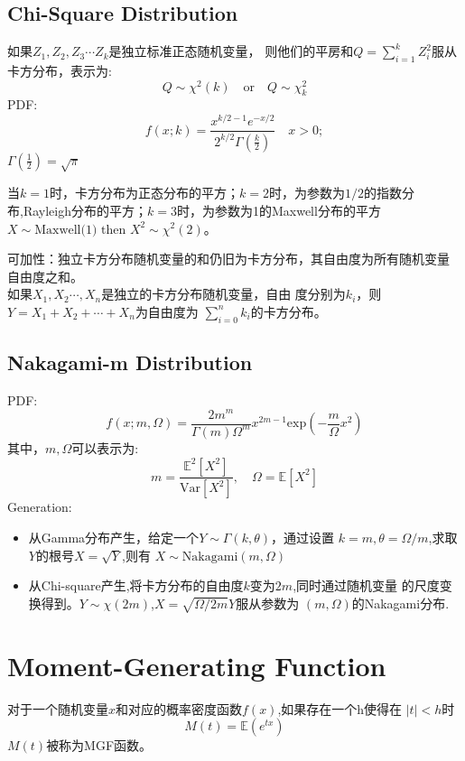 \documentclass[fontset=none,oneside]{book}
\begin{document}
\subsection{Chi-Square Distribution}
\noindent 如果$Z_{1},Z_{2},Z_{3}\cdots Z_{k}$是独立标准正态随机变量，
则他们的平房和$Q=\sum_{i=1}^{k}Z_{i}^{2}$服从卡方分布，表示为:
\begin{equation}
\label{eq:33}
Q\sim \chi^{2}(k)\quad\text{or}\quad Q\sim\chi_{k}^{2}
\end{equation}
PDF:
\begin{equation}
\label{eq:34}
f(x;k)=\frac{x^{k/2-1}e^{-x/2}}{2^{k/2}\Gamma(\frac{k}{2})} \quad x>0;
\end{equation}
$\Gamma(\frac{1}{2})=\sqrt{\pi}$
\begin{shaded}
当$k=1$时，卡方分布为正态分布的平方；$k=2$时，为参数为$1/2$的指数分
布,Rayleigh分布的平方；$k=3$时，为参数为1的Maxwell分布的平方
$X\sim\text{Maxwell(1) then }X^{2}\sim\chi^{2}(2)$。
\end{shaded}
可加性：独立卡方分布随机变量的和仍旧为卡方分布，其自由度为所有随机变量
自由度之和。\\

如果$X_{1},X_{2}\cdots,X_{n}$是独立的卡方分布随机变量，自由
度分别为$k_{i}$，则$Y=X_{1}+X_{2}+\cdots+X_{n}$为自由度为
$\sum_{i=0}^{n}k_{i}$的卡方分布。
\subsection{Nakagami-m Distribution}
\noindent PDF:
\begin{equation}
\label{eq:37}
f(x;m,\Omega)=\frac{2m^{m}}{\Gamma(m)\Omega^{m}}x^{2m-1}\mathrm{exp}(-\frac{m}{\Omega}x^{2})
\end{equation}
其中，$m,\Omega$可以表示为:
\begin{equation}
\label{eq:38}
m=\frac{\mathbb{E}^{2}[X^{2}]}{\mathrm{Var}[X^{2}]},\quad \Omega=\mathbb{E}[X^{2}]
\end{equation}
Generation:
\begin{itemize}
\item 从Gamma分布产生，给定一个$Y\sim\Gamma(k,\theta)$，通过设置
  $k=m,\theta=\Omega/m$,求取$Y$的根号$X=\sqrt{Y}$,则有
  $X\sim\mathrm{Nakagami}(m,\Omega)$
\item 从Chi-square产生,将卡方分布的自由度$k$变为$2m$,同时通过随机变量
  的尺度变换得到。$Y\sim\chi(2m)$,$X=\sqrt{\Omega/2m}Y$服从参数为
  $(m,\Omega)$的Nakagami分布.
\end{itemize}
\section{Moment-Generating Function}
对于一个随机变量$x$和对应的概率密度函数$f(x)$,如果存在一个h使得在
$|t|<h$时
\begin{equation}
\label{eq:41}
M(t)=\mathbb{E}(e^{tx})
\end{equation}
$M(t)$被称为MGF函数。
\end{document}
